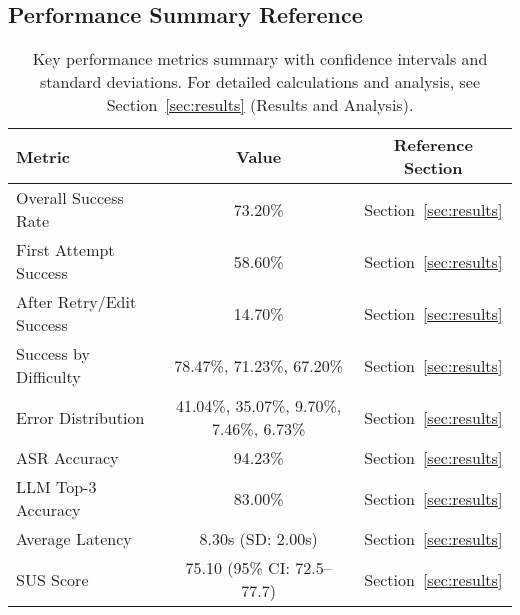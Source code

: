 \documentclass[a4paper,12pt]{article}
\begin{document}
\subsection{Performance Summary Reference}
\begin{table}[h!]
\centering
\begin{tabular}{|l|c|c|}
\hline
\textbf{Metric} & \textbf{Value} & \textbf{Reference Section} \\
\hline
Overall Success Rate & 73.20\% & Section~\ref{sec:results} \\
First Attempt Success & 58.60\% & Section~\ref{sec:results} \\
After Retry/Edit Success & 14.70\% & Section~\ref{sec:results} \\
Success by Difficulty & 78.47\%, 71.23\%, 67.20\% & Section~\ref{sec:results} \\
Error Distribution & 41.04\%, 35.07\%, 9.70\%, 7.46\%, 6.73\% & Section~\ref{sec:results} \\
ASR Accuracy & 94.23\% & Section~\ref{sec:results} \\
LLM Top-3 Accuracy & 83.00\% & Section~\ref{sec:results} \\
Average Latency & 8.30s (SD: 2.00s) & Section~\ref{sec:results} \\
SUS Score & 75.10 (95\% CI: 72.5–77.7) & Section~\ref{sec:results} \\
\hline
\end{tabular}
\caption{Key performance metrics summary with confidence intervals and standard deviations. For detailed calculations and analysis, see Section~\ref{sec:results} (Results and Analysis).}
\end{table}
\end{document}
